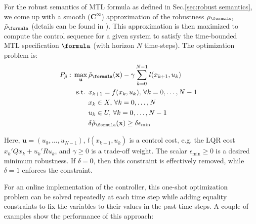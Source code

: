 \newcommand{\fe}{f_\varepsilon}

For the robust semantics of MTL formula as defined in Sec.\ref{sec:robust semantics}, we come up with a smooth ($\mathbf{C}^{\infty}$) approximation of the robustness $\rob_\formula$, $\srob_\formula$ (details can be found in \cite{PantAM17_SmoothOpTechRpt}). This approximation is then maximized to compute the control sequence for a given system to satisfy the time-bounded MTL specification $\formula$ (with horizon $N$ time-steps). The optimization problem is:
\begin{subequations}
	\label{eq:general_ctrl}
	\begin{align}
	P_{\srob}:\, \max_{\mathbf{u}}\, & \srob_{\formula}(\sstraj) - \gamma \sum_{k=0}^{N-1} l(x_{k+1},u_{k}) \label{eq:general ctrl obj}\\
	\text{s.t. } & x_{k+1} = f(x_k,u_k), \, \forall k=0,\dotsc,N-1 \label{eq:general ctrl dyn}\\
	& x_k \in X, \, \forall k=0,\dotsc,N \label{eq:general ctrl X}\\
	& u_k \in U, \, \forall k=0,\dotsc,N-1 \label{eq:general ctrl U}\\
	& \delta \srob_{\formula}(\sstraj) \geq \delta \epsilon_{\text{min}} \label{eq:general ctrl pos rob}
	\end{align}
\end{subequations}

Here, $\mathbf{u} = (u_0,\ldots,u_{N-1})$, 
$l(x_{k+1},u_{k})$ is a control cost, e.g. the LQR cost $x_k'Qx_k + u_k'Ru_k$,
and $\gamma \geq 0$ is a trade-off weight. 
The scalar $\epsilon_{\text{min}} \geq 0$ is a desired minimum robustness. 
If $\delta = 0$, then this constraint is effectively removed, while $\delta=1$ enforces the constraint.


For an online implementation of the controller, this one-shot optimization problem can be solved repeatedly at each time step while adding equality constraints to fix the variables to their values in the past time steps. A couple of examples show the performance of this approach:

